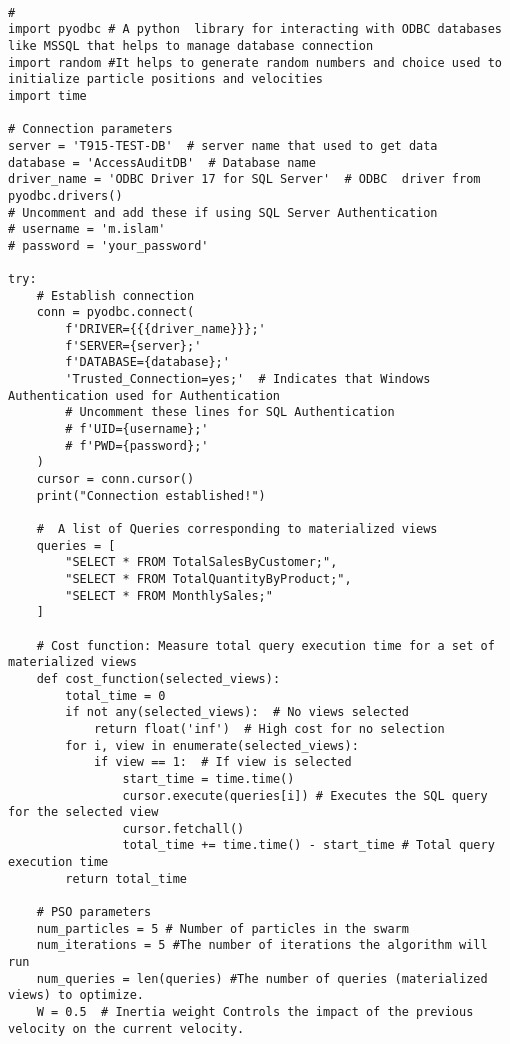 
\begin{lstlisting}[style=pythonstyle, caption={Python script to automate optimal view.}, label={lst:pso_query_optimization}]

# 
import pyodbc # A python  library for interacting with ODBC databases like MSSQL that helps to manage database connection
import random #It helps to generate random numbers and choice used to initialize particle positions and velocities
import time

# Connection parameters
server = 'T915-TEST-DB'  # server name that used to get data 
database = 'AccessAuditDB'  # Database name
driver_name = 'ODBC Driver 17 for SQL Server'  # ODBC  driver from pyodbc.drivers()
# Uncomment and add these if using SQL Server Authentication
# username = 'm.islam'
# password = 'your_password'

try:
    # Establish connection
    conn = pyodbc.connect(
        f'DRIVER={{{driver_name}}};'
        f'SERVER={server};'
        f'DATABASE={database};'
        'Trusted_Connection=yes;'  # Indicates that Windows Authentication used for Authentication
        # Uncomment these lines for SQL Authentication
        # f'UID={username};'
        # f'PWD={password};'
    )
    cursor = conn.cursor()
    print("Connection established!")

    #  A list of Queries corresponding to materialized views
    queries = [
        "SELECT * FROM TotalSalesByCustomer;",
        "SELECT * FROM TotalQuantityByProduct;",
        "SELECT * FROM MonthlySales;"
    ]

    # Cost function: Measure total query execution time for a set of materialized views 
    def cost_function(selected_views):
        total_time = 0
        if not any(selected_views):  # No views selected
            return float('inf')  # High cost for no selection
        for i, view in enumerate(selected_views):
            if view == 1:  # If view is selected
                start_time = time.time()
                cursor.execute(queries[i]) # Executes the SQL query for the selected view
                cursor.fetchall()
                total_time += time.time() - start_time # Total query execution time 
        return total_time

    # PSO parameters
    num_particles = 5 # Number of particles in the swarm 
    num_iterations = 5 #The number of iterations the algorithm will run
    num_queries = len(queries) #The number of queries (materialized views) to optimize.
    W = 0.5  # Inertia weight Controls the impact of the previous velocity on the current velocity.


\end{lstlisting}
